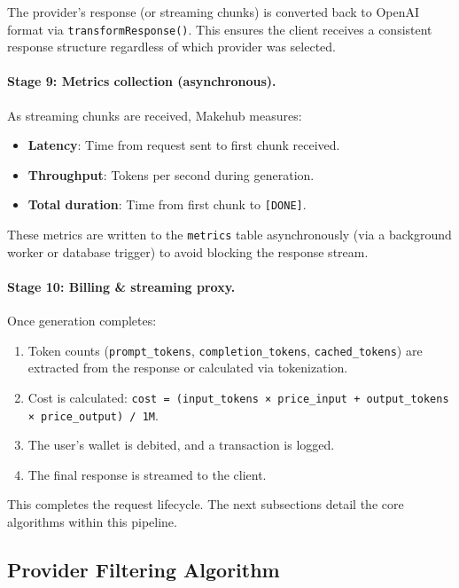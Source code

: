 \documentclass[english]{article}
\begin{document}
The provider's response (or streaming chunks) is converted back to OpenAI format via \texttt{transformResponse()}. This ensures the client receives a consistent response structure regardless of which provider was selected.

\paragraph{Stage 9: Metrics collection (asynchronous).}

As streaming chunks are received, Makehub measures:
\begin{itemize}
    \item \textbf{Latency}: Time from request sent to first chunk received.
    \item \textbf{Throughput}: Tokens per second during generation.
    \item \textbf{Total duration}: Time from first chunk to \texttt{[DONE]}.
\end{itemize}

These metrics are written to the \texttt{metrics} table asynchronously (via a background worker or database trigger) to avoid blocking the response stream.

\paragraph{Stage 10: Billing \& streaming proxy.}

Once generation completes:
\begin{enumerate}
    \item Token counts (\texttt{prompt\_tokens}, \texttt{completion\_tokens}, \texttt{cached\_tokens}) are extracted from the response or calculated via tokenization.
    \item Cost is calculated: \texttt{cost = (input\_tokens × price\_input + output\_tokens × price\_output) / 1M}.
    \item The user's wallet is debited, and a transaction is logged.
    \item The final response is streamed to the client.
\end{enumerate}

This completes the request lifecycle. The next subsections detail the core algorithms within this pipeline.


\subsection{Provider Filtering Algorithm}
\end{document}
